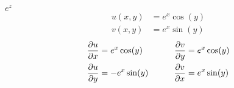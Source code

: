 \item[6.] $e^z$
\begin{align*}
    u(x,y) &= e^x\cos(y)\\
    v(x,y) &= e^x\sin(y)
\end{align*}
\begin{align*}
    \frac{\partial u}{\partial x}  &= e^x\cos(y)  &\qquad \frac{\partial v}{\partial y}  &= e^x\cos(y)\\ 
    \frac{\partial u}{\partial y}  &= -e^x\sin(y)  &\qquad \frac{\partial v}{\partial x}  &= e^x\sin(y) 
\end{align*}
